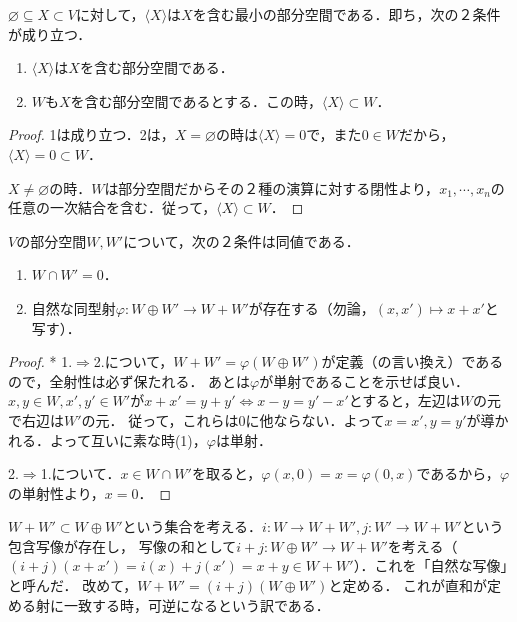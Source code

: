 \documentclass[uplatex, 12pt, dvipdfmx]{jsreport}
\begin{document}
\begin{proposition}[生成する部分空間の特徴付け：閉包]
    $\varnothing\subseteq X\subset V$に対して，$\langle X\rangle$は$X$を含む最小の部分空間である．即ち，次の２条件が成り立つ．
    \begin{enumerate}
        \item $\langle X\rangle$は$X$を含む部分空間である．
        \item $W$も$X$を含む部分空間であるとする．この時，$\langle X\rangle\subset W$．
    \end{enumerate}
\end{proposition}
\begin{proof}
    1は成り立つ．2は，$X=\varnothing$の時は$\langle X\rangle =0$で，また$0\in W$だから，$\langle X\rangle =0\subset W$．

    $X\ne\varnothing$の時．$W$は部分空間だからその２種の演算に対する閉性より，$x_1,\cdots,x_n$の任意の一次結合を含む．従って，$\langle X\rangle\subset W$．
\end{proof}

\begin{proposition}[互いに素であることの特徴付け]\label{prop-characterization-of-direct-sum}
    $V$の部分空間$W,W'$について，次の２条件は同値である．
    \begin{enumerate}
        \item $W\cap W'=0$．
        \item 自然な同型射$\varphi:W\oplus W'\to W+W'$が存在する（勿論，$(x,x')\mapsto x+x'$と写す）．
    \end{enumerate}
\end{proposition}
\begin{proof}* 
    1.$\Rightarrow$2.について，$W+W'=\varphi(W\oplus W')$が定義（の言い換え）であるので，全射性は必ず保たれる．
    あとは$\varphi$が単射であることを示せば良い．
    $x,y\in W,x',y'\in W'$が$x+x'=y+y'\Leftrightarrow x-y=y'-x'$とすると，左辺は$W$の元で右辺は$W'$の元．
    従って，これらは$0$に他ならない．よって$x=x',y=y'$が導かれる．よって互いに素な時(1)，$\varphi$は単射．

    2.$\Rightarrow$1.について．$x\in W\cap W'$を取ると，$\varphi(x,0)=x=\varphi(0,x)$であるから，$\varphi$の単射性より，$x=0$．
\end{proof}
\begin{remark}
    $W+W'\subset W\oplus W'$という集合を考える．$i:W\to W+W', j:W'\to W+W'$という包含写像が存在し，
    写像の和として$i+j:W\oplus  W'\to W+W'$を考える（$(i+j)(x+x')=i(x)+j(x')=x+y\in W+W'$）．これを「自然な写像」と呼んだ．
    改めて，$W+W'=(i+j)(W\oplus W')$と定める．
    これが直和が定める射に一致する時，可逆になるという訳である．
\end{remark}
\end{document}
